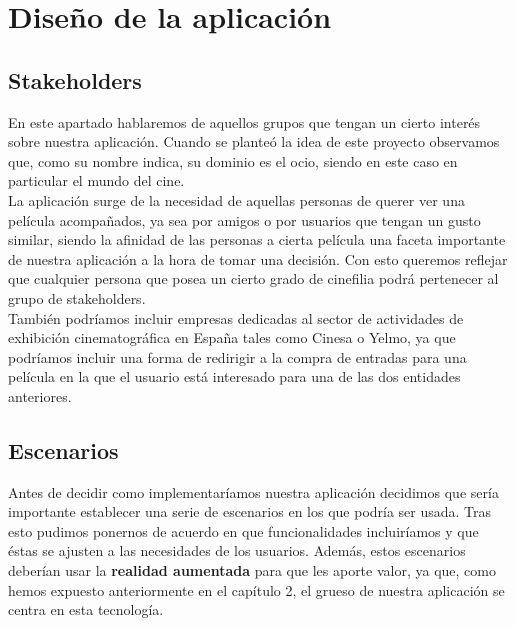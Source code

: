 
\cleardoublepage


\chapter{Diseño de la aplicación}
\label{makereference3}

\section{Stakeholders}
\label{makereference3.1}
En este apartado hablaremos de aquellos grupos que tengan un cierto interés sobre nuestra aplicación. Cuando se planteó
la idea de este proyecto observamos que, como su nombre indica, su dominio es el ocio, siendo en este caso en particular el mundo del cine.
\\
La aplicación surge de la necesidad de aquellas personas de querer ver una película acompañados, ya sea por amigos o por usuarios que tengan un gusto similar, 
siendo la afinidad de las personas a cierta película una faceta importante de nuestra aplicación a la hora de tomar una decisión. Con esto queremos reflejar que 
cualquier persona que posea un cierto grado de cinefilia podrá pertenecer al grupo de stakeholders.
\\
También podríamos incluir empresas dedicadas al sector de actividades de exhibición cinematográfica en España tales como Cinesa o Yelmo, ya que podríamos incluir 
una forma de redirigir a la compra de entradas para una película en la que el usuario está interesado para una de las dos entidades anteriores.
\newpage 
\section{Escenarios}
\label{makereference3.2}
Antes de decidir como implementaríamos nuestra aplicación decidimos que sería importante establecer una serie
de escenarios en los que podría ser usada. Tras esto pudimos ponernos de acuerdo en que funcionalidades incluiríamos y que 
éstas se ajusten a las necesidades de los usuarios. Además, estos escenarios deberían usar la \textbf{realidad aumentada} para que 
les aporte valor, ya que, como hemos expuesto anteriormente en el capítulo 2, el grueso de nuestra aplicación se centra en esta tecnología.

